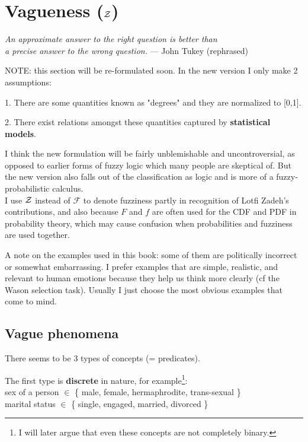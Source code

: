 \chapter{Vagueness ($\mathcal{Z}$)}
\label{ch:vagueness}
\begin{flushright}
\emph{An approximate answer to the right question is better than\\
a precise answer to the wrong question.} --- John Tukey (rephrased)
\end{flushright}
\minitoc

NOTE:  this section will be re-formulated soon.  In the new version I only make 2 assumptions:

1. There are some quantities known as "degrees" and they are normalized to [0,1].

2. There exist relations amongst these quantities captured by \textbf{statistical models}.

I think the new formulation will be fairly unblemishable and uncontroversial, as opposed to earlier forms of fuzzy logic which many people are skeptical of.  But the new version also falls out of the classification as logic and is more of a fuzzy-probabilistic calculus.
\\

\footnotesize
I use $\mathcal{Z}$ instead of $\mathcal{F}$ to denote fuzziness partly in recognition of Lotfi Zadeh's contributions, and also because $F$ and $f$ are often used for the CDF and PDF in probability theory, which may cause confusion when probabilities and fuzziness are used together.

A note on the examples used in this book:  some of them are politically incorrect or somewhat embarrassing.  I prefer examples that are simple, realistic, and relevant to human emotions because they help us think more clearly (cf the Wason selection task).  Usually I just choose the most obvious examples that come to mind.
\normalsize

\section{Vague phenomena}

There seems to be 3 types of concepts (= predicates).

The first type is \textbf{discrete} in nature, for example\footnote{I will later argue that even these concepts are not completely binary.}:\\
\hspace*{1cm} sex of a person $\in$ \{ male, female, hermaphrodite, trans-sexual \}\\
\hspace*{1cm} marital status $\in$ \{ single, engaged, married, divorced \}

